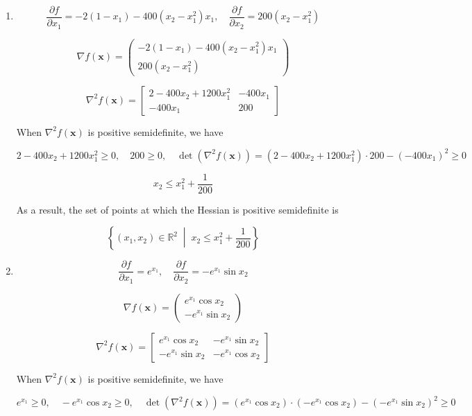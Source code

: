 \documentclass[10pt,a4paper]{article}
\begin{document}
\begin{enumerate}
    \item[3. ]
    $$
    \frac{\partial f}{\partial x_1} = -2(1-x_1) - 400(x_2-x_1^2)x_1
    ,\quad
    \frac{\partial f}{\partial x_2} = 200(x_2-x_1^2)
    $$

    $$
    \nabla f(\mathbf{x}) =
    \begin{pmatrix}
        -2(1-x_1) - 400(x_2-x_1^2)x_1\\
        200(x_2-x_1^2)
    \end{pmatrix}
    $$

    $$
    \nabla^2 f(\mathbf{x}) =
    \begin{bmatrix}
        2 - 400x_2+ 1200 x_1^2 & -400x_1\\
        -400x_1 & 200
    \end{bmatrix}
    $$

    When $\nabla^2 f(\mathbf{x})$ is positive semidefinite, we have

    $$
    2 - 400x_2+ 1200 x_1^2 \geq 0
    ,\quad
    200 \geq 0
    ,\quad
    \det(\nabla^2 f(\mathbf{x})) = (2 - 400x_2+ 1200 x_1^2) \cdot 200 - (-400x_1)^2 \geq 0
    $$

    $$
    x_2 \leq x_1^2 + \frac{1}{200}
    $$

    As a result, the set of points at which the Hessian is positive semidefinite is

    $$
    \left\{(x_1, x_2) \in \mathbb{R}^2 \;\middle\vert{}\; x_2 \le x_1^2 + \frac{1}{200}\right\}
    $$

    \item[4. ]
    $$
    \frac{\partial f}{\partial x_1} = e^{x_1}
    ,\quad
    \frac{\partial f}{\partial x_2} = -e^{x_1}\sin x_2
    $$

    $$
    \nabla f(\mathbf{x}) =
    \begin{pmatrix}
        e^{x_1}\cos x_2\\
        -e^{x_1}\sin x_2
    \end{pmatrix}
    $$

    $$
    \nabla^2 f(\mathbf{x}) =
    \begin{bmatrix}
        e^{x_1}\cos x_2 & -e^{x_1}\sin x_2\\
        -e^{x_1}\sin x_2 & -e^{x_1}\cos x_2
    \end{bmatrix}
    $$

    When $\nabla^2 f(\mathbf{x})$ is positive semidefinite, we have

    $$
    e^{x_1} \geq 0
    ,\quad
    -e^{x_1}\cos x_2 \geq 0
    ,\quad
    \det(\nabla^2 f(\mathbf{x})) = (e^{x_1}\cos x_2) \cdot (-e^{x_1}\cos x_2) - (-e^{x_1}\sin x_2)^2 \geq 0
    $$


\end{enumerate}
\end{document}
